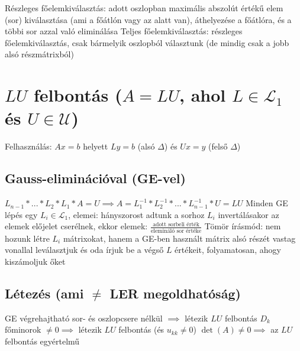 \documentclass[12pt,a4paper]{article}
\begin{document}
\begin{outline}
	\1 Részleges főelemkiválasztás: adott oszlopban maximális abszolút értékű elem (sor) kiválasztása (ami a főátlón vagy az alatt van), áthelyezése a főátlóra, és a többi sor azzal való eliminálása
	\1 Teljes főelemkiválasztás: részleges főelemkiválasztás, csak bármelyik oszlopból választunk (de mindig csak a jobb alsó részmátrixból)	
\end{outline}

\pagebreak

\section{$LU$ felbontás ($A = LU$, ahol $L \in \mathcal{L}_1$ és $U \in \mathcal{U}$)}

\begin{outline}
	\1 Felhasználás: $Ax=b$ helyett $Ly=b$ (alsó $\Delta$) és $Ux=y$ (felső $\Delta$)
\end{outline}

\subsection{Gauss-eliminációval (GE-vel)}

\begin{outline}
	\1 $L_{n-1} * ... * L_2 * L_1 * A = U \implies
	A = L_1^{-1} * L_2^{-1} * ... * L_{n-1}^{-1} * U = LU$
	\1 Minden GE lépés egy $L_i \in \mathcal{L}_1$, elemei: hányszorost adtunk a sorhoz
	\1 $L_i$ invertálásakor az elemek előjelet cserélnek, ekkor elemek: $\frac{\text{adott sorbeli érték}}{\text{elemináló sor értéke}}$
	\1 Tömör írásmód: nem hozunk létre $L_i$ mátrixokat, hanem a GE-ben használt mátrix alsó részét vastag vonallal leválasztjuk és oda írjuk be a végső $L$ értékeit, folyamatosan, ahogy kiszámoljuk őket
\end{outline}

\subsection{Létezés (ami $\ne$ LER megoldhatóság)}

\begin{outline}
	\1 GE végrehajtható sor- és oszlopcsere nélkül $\implies$ létezik $LU$ felbontás
	\1 $D_k$ főminorok $\ne 0 \implies$ létezik $LU$ felbontás (és $u_{kk} \ne 0$)
	\1 $\det(A) \ne 0 \implies$ az $LU$ felbontás egyértelmű
\end{outline}
\end{document}
